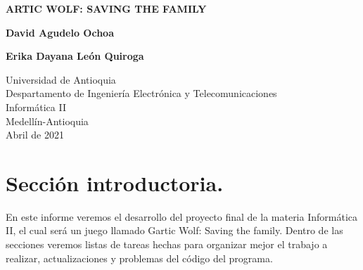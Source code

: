 \documentclass{article}
\begin{document}
\begin{titlepage}
    \begin{center}
        \vspace*{0cm}
            
        \large
        \textbf{ARTIC WOLF: SAVING THE FAMILY}
            
        \vfill
            
        \vspace{0.8cm}
            
        \textbf{David Agudelo Ochoa}
        
        \vspace{5mm}
        
        \textbf{Erika Dayana León Quiroga}
            
        \vfill
            
        \vspace{0.8cm}
            
        \Large
        Universidad de Antioquia\\
        Despartamento de Ingeniería Electrónica y Telecomunicaciones\\
        Informática II\\
        Medellín-Antioquia\\
        Abril de 2021
            
    \end{center}
\end{titlepage}

\tableofcontents
\newpage
\section{Sección introductoria.}
En este informe veremos el desarrollo del proyecto final de la materia Informática II, el cual será un juego llamado Gartic Wolf: Saving the family. Dentro de las secciones veremos listas de tareas hechas para organizar mejor el trabajo a realizar, actualizaciones y problemas del código del programa.
\end{document}
